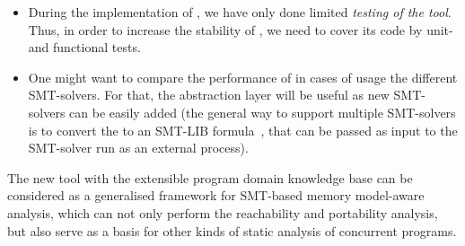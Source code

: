 \begin{itemize}[leftmargin=\parindent]
\item During the implementation of \porthos[2], we have only done limited \textit{testing of the tool}.
Thus, in order to increase the stability of \porthos[2], we need to cover its code by unit- and functional tests.

\item One might want to compare the performance of \porthos[2] in cases of usage the different SMT-solvers.
For that, the \zformula{} abstraction layer will be useful as new SMT-solvers can be easily added (the general way to support multiple SMT-solvers is to convert the \zformula{} to an SMT-LIB formula~\cite{smt-lib}, that can be passed as input to the SMT-solver run as an external process).







\end{itemize}


\ifdefined\IsAalto
\else
  \vspace*{1em}
\fi


The new tool \porthos[2] with the extensible program domain knowledge base can be considered as a generalised framework for SMT-based memory model-aware analysis, which can not only perform the reachability and portability analysis, but also serve as a basis for other kinds of static analysis of concurrent programs.
